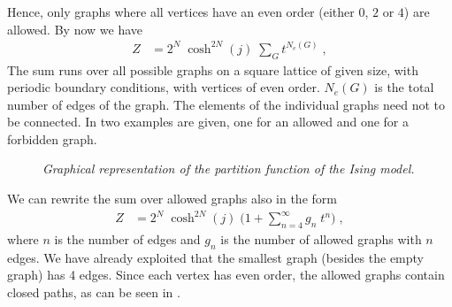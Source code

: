 Hence, only graphs where all vertices have an even order (either $0$, $2$ or $4$) are allowed. By now we have
\begin{align*}
Z&=2^{N}\; \cosh^{2N}(j) \;\sum_{G} t^{N_{e}(G)}\;,
\end{align*}
The sum runs over all possible graphs on a square lattice of given size, with periodic boundary conditions, with vertices of even order.
$N_{e}(G)$ is the total number of edges of the graph. The elements of the individual graphs need not to be connected.
In  two examples are given, one for an allowed and one for a forbidden 
graph.
%
\begin{figure}[t]
\caption{{\it Graphical representation of the partition function of the Ising model.}\label{fig:graph:ising}}
\end{figure}
%
We can rewrite the sum over allowed graphs also in the form
\begin{align}\label{eq:ising:Z:g}
Z&=2^{N}\; \cosh^{2N}(j) \;\big(1+\sum_{n=4}^{\infty} g_{n}\;t^{n}\big)\;,
\end{align}
where $n$ is the number of edges and $g_{n}$ is the number of allowed graphs
with $n$ edges. We have already exploited that the smallest graph (besides the empty graph) has 4 edges.
Since each vertex has even order, the allowed graphs contain closed paths,
as can be seen in . 



